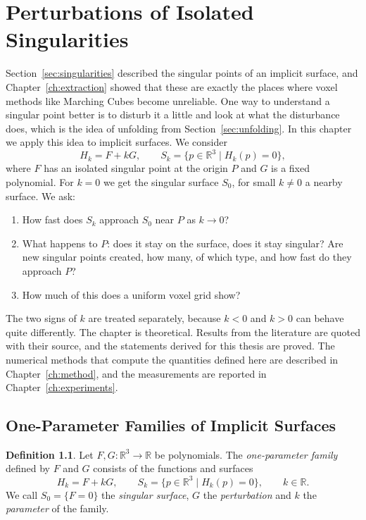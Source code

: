 \documentclass[12pt, a4paper, oneside]{book}
\theoremstyle{plain}
\theoremstyle{definition}
\newtheorem{definition}[theorem]{Definition}
\theoremstyle{remark}
\theoremstyle{definition}
\begin{document}
\chapter{Perturbations of Isolated Singularities}
\label{ch:theory}

Section~\ref{sec:singularities} described the singular points of an implicit surface, and Chapter~\ref{ch:extraction} showed that these are exactly the places where voxel methods like Marching Cubes become unreliable. One way to understand a singular point better is to disturb it a little and look at what the disturbance does, which is the idea of unfolding from Section~\ref{sec:unfolding}. In this chapter we apply this idea to implicit surfaces. We consider
\[
H_k=F+kG,\qquad S_k=\{p\in\mathbb{R}^3 \mid H_k(p)=0\},
\]
where $F$ has an isolated singular point at the origin $P$ and $G$ is a fixed polynomial. For $k=0$ we get the singular surface $S_0$, for small $k\neq0$ a nearby surface. We ask:
\begin{enumerate}
    \item[(Q1)] How fast does $S_k$ approach $S_0$ near $P$ as $k\to0$?
    \item[(Q2)] What happens to $P$: does it stay on the surface, does it stay singular? Are new singular points created, how many, of which type, and how fast do they approach $P$?
    \item[(Q3)] How much of this does a uniform voxel grid show?
\end{enumerate}
The two signs of $k$ are treated separately, because $k<0$ and $k>0$ can behave quite differently. The chapter is theoretical. Results from the literature are quoted with their source, and the statements derived for this thesis are proved. The numerical methods that compute the quantities defined here are described in Chapter~\ref{ch:method}, and the measurements are reported in Chapter~\ref{ch:experiments}.

\section{One-Parameter Families of Implicit Surfaces}
\label{sec:families}

\begin{definition}
\label{def:family}
Let $F,G:\mathbb{R}^3\to\mathbb{R}$ be polynomials. The \emph{one-parameter family} defined by $F$ and $G$ consists of the functions and surfaces
\begin{equation}
\label{eq:family}
H_k=F+kG,\qquad S_k=\{p\in\mathbb{R}^3 \mid H_k(p)=0\},\qquad k\in\mathbb{R}.
\end{equation}
We call $S_0=\{F=0\}$ the \emph{singular surface}, $G$ the \emph{perturbation} and $k$ the \emph{parameter} of the family.
\end{definition}
\end{document}
